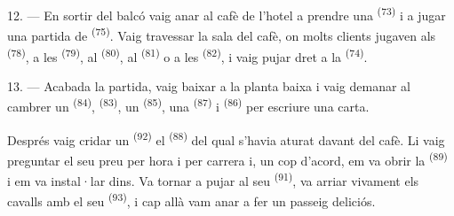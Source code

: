 12. --- En sortir del balcó vaig anar al cafè de l'hotel a prendre una
 \textsuperscript{(73)} i a jugar una partida de
 \textsuperscript{(75)}. Vaig travessar la sala del cafè, on molts
clients jugaven als  \textsuperscript{(78)}, a les 
\textsuperscript{(79)}, al  \textsuperscript{(80)}, al
 \textsuperscript{(81)} o a les 
\textsuperscript{(82)}, i vaig pujar dret a la 
\textsuperscript{(74)}.

13. --- Acabada la partida, vaig baixar a la planta baixa i vaig demanar al
cambrer un  \textsuperscript{(84)}, 
\textsuperscript{(83)}, un  \textsuperscript{(85)}, una
 \textsuperscript{(87)} i  \textsuperscript{(86)} per
escriure una carta.

Després vaig cridar un  \textsuperscript{(92)} el 
\textsuperscript{(88)} del qual s'havia aturat davant del cafè. Li vaig preguntar
el seu preu per hora i per carrera i, un cop d'acord, em va obrir la
 \textsuperscript{(89)} i em va instal·lar dins. Va tornar a pujar
al seu  \textsuperscript{(91)}, va arriar vivament els cavalls amb
el seu  \textsuperscript{(93)}, i cap allà vam anar a fer un passeig
deliciós.
\VUsaut{6.0mm}
\VUfilet{22mm}

